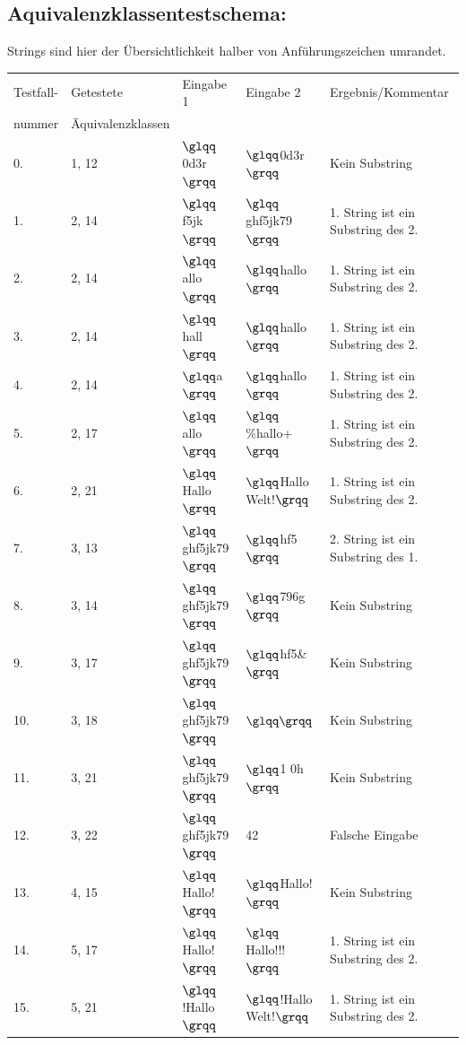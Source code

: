 \documentclass[a4paper]{report}
\begin{document}
\subsection*{Aquivalenzklassentestschema:}
Strings sind hier der Übersichtlichkeit halber von Anführungszeichen umrandet.\\
\begin{tabular}{l|l|ll|l}
Testfall- 	& Getestete 		& Eingabe 1  	& Eingabe 2 	& Ergebnis/Kommentar\\
nummer		& Äquivalenzklassen	& 				&				&\\
\hline
0.			& 1, 12				& $\glqq$0d3r$\grqq$		& $\glqq$0d3r$\grqq$		& Kein Substring\\
1.			& 2, 14				& $\glqq$f5jk$\grqq$		& $\glqq$ghf5jk79$\grqq$	& 1. String ist ein Substring des 2.\\
2.			& 2, 14				& $\glqq$allo$\grqq$		& $\glqq$hallo$\grqq$		& 1. String ist ein Substring des 2.\\
3.			& 2, 14				& $\glqq$hall$\grqq$		& $\glqq$hallo$\grqq$		& 1. String ist ein Substring des 2.\\
4.			& 2, 14				& $\glqq$a$\grqq$			& $\glqq$hallo$\grqq$		& 1. String ist ein Substring des 2.\\
5.			& 2, 17				& $\glqq$allo$\grqq$		& $\glqq$\%hallo+$\grqq$	& 1. String ist ein Substring des 2.\\
6.			& 2, 21				& $\glqq$Hallo$\grqq$		& $\glqq$Hallo Welt!$\grqq$& 1. String ist ein Substring des 2.\\
7.			& 3, 13				& $\glqq$ghf5jk79$\grqq$	& $\glqq$hf5$\grqq$			& 2. String ist ein Substring des 1.\\
8.			& 3, 14				& $\glqq$ghf5jk79$\grqq$	& $\glqq$796g$\grqq$		& Kein Substring\\
9.			& 3, 17				& $\glqq$ghf5jk79$\grqq$	& $\glqq$hf5\&$\grqq$		& Kein Substring\\
10.			& 3, 18				& $\glqq$ghf5jk79$\grqq$	& $\glqq \grqq$				& Kein Substring\\
11.			& 3, 21				& $\glqq$ghf5jk79$\grqq$	& $\glqq$1 0h$\grqq$		& Kein Substring\\
12.			& 3, 22				& $\glqq$ghf5jk79$\grqq$	& 42						& Falsche Eingabe\\
13.			& 4, 15				& $\glqq$Hallo!$\grqq$		& $\glqq$Hallo!$\grqq$		& Kein Substring\\
14.			& 5, 17				& $\glqq$Hallo!$\grqq$		& $\glqq$Hallo!!!$\grqq$	& 1. String ist ein Substring des 2.\\
15.			& 5, 21				& $\glqq$!Hallo$\grqq$		& $\glqq$!Hallo Welt!$\grqq$& 1. String ist ein Substring des 2.\\

\end{tabular}
\end{document}
